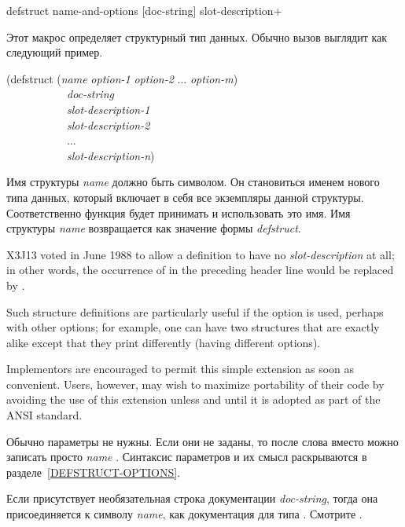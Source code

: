 \begin{defmac}
defstruct name-and-options [doc-string] {slot-description}+

Этот макрос определяет структурный тип данных.
Обычно вызов  выглядит как следующий пример.
\begin{lisp}
(defstruct (\emph{name} \emph{option-1} \emph{option-2} ... \emph{option-m}) \\
~~~~~~~~~~~\emph{doc-string} \\
~~~~~~~~~~~\emph{slot-description-1} \\
~~~~~~~~~~~\emph{slot-description-2} \\
~~~~~~~~~~~... \\
~~~~~~~~~~~\emph{slot-description-n}) \\
\end{lisp}
Имя структуры \emph{name} должно быть символом. Он становиться именем нового типа данных,
который включает в себя все экземпляры данной структуры.
Соответственно функция  будет принимать и использовать это
имя. Имя структуры \emph{name} возвращается как значение формы \emph{defstruct}.

\begin{new}\noindent
X3J13 voted in June 1988
to allow a  definition
to have no \emph{slot-description} at all; in other words, the
occurrence of  in the preceding
header line would be replaced by .

Such structure definitions are particularly useful if the
 option is used, perhaps with other options; for example,
one can have two structures that are exactly alike except that they
print differently (having different  options).

Implementors are encouraged to permit this simple extension as soon as
convenient.  Users, however, may wish to maximize portability of their
code by avoiding the use of this extension unless and until it is
adopted as part of the ANSI standard.
\end{new}

Обычно параметры не нужны. Если они не заданы, то после слова  вместо
 можно записать просто \emph{name} . Синтаксис параметров и их
смысл раскрываются в разделе~\ref{DEFSTRUCT-OPTIONS}.

Если присутствует необязательная строка документации \emph{doc-string}, тогда
она присоединяется к символу \emph{name}, как документация для типа
. Смотрите .


\end{defmac}
